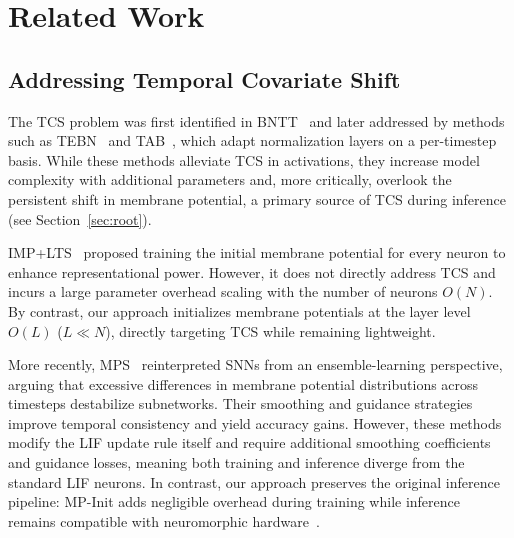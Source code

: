 \section{Related Work}
\label{sec:related}

\subsection{Addressing Temporal Covariate Shift}
The TCS problem was first identified in BNTT~\cite{bntt:2020} and later addressed by methods such as TEBN~\cite{tebn:2022} and TAB~\cite{tab:2024}, which adapt normalization layers on a per-timestep basis. While these methods alleviate TCS in activations, they increase model complexity with additional parameters and, more critically, overlook the persistent shift in membrane potential, a primary source of TCS during inference (see Section~\ref{sec:root}). 

IMP+LTS~\cite{shen:2024} proposed training the initial membrane potential for every neuron to enhance representational power. However, it does not directly address TCS and incurs a large parameter overhead scaling with the number of neurons $O(N)$. By contrast, our approach initializes membrane potentials at the layer level $O(L)$ ($L \ll N$), directly targeting TCS while remaining lightweight.

More recently, MPS~\cite{ding:2025} reinterpreted SNNs from an ensemble-learning perspective, arguing that excessive differences in membrane potential distributions across timesteps destabilize subnetworks. Their smoothing and guidance strategies improve temporal consistency and yield accuracy gains. However, these methods modify the LIF update rule itself and require additional smoothing coefficients and guidance losses, meaning both training and inference diverge from the standard LIF neurons. In contrast, our approach preserves the original inference pipeline: MP-Init adds negligible overhead during training while inference remains compatible with neuromorphic hardware~\cite{davies:2018}.


